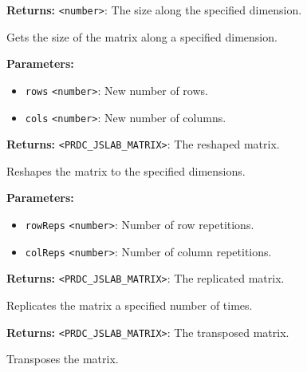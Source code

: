 \documentclass[12pt,a4paper]{article}
\begin{document}
\noindent \textbf{Returns:} \texttt{<number>}: The size along the specified dimension.

\noindent Gets the size of the matrix along a specified dimension.

\vspace{5mm}
\noindent {}


\noindent \textbf{Parameters:}
\begin{itemize}
  \item \texttt{rows} \texttt{<number>}: New number of rows.
  \item \texttt{cols} \texttt{<number>}: New number of columns.
\end{itemize}

\noindent \textbf{Returns:} \texttt{<PRDC\_JSLAB\_MATRIX>}: The reshaped matrix.

\noindent Reshapes the matrix to the specified dimensions.

\vspace{5mm}
\noindent {}


\noindent \textbf{Parameters:}
\begin{itemize}
  \item \texttt{rowReps} \texttt{<number>}: Number of row repetitions.
  \item \texttt{colReps} \texttt{<number>}: Number of column repetitions.
\end{itemize}

\noindent \textbf{Returns:} \texttt{<PRDC\_JSLAB\_MATRIX>}: The replicated matrix.

\noindent Replicates the matrix a specified number of times.

\vspace{5mm}
\noindent {}


\noindent \textbf{Returns:} \texttt{<PRDC\_JSLAB\_MATRIX>}: The transposed matrix.

\noindent Transposes the matrix.

\vspace{5mm}
\noindent {}
\end{document}
